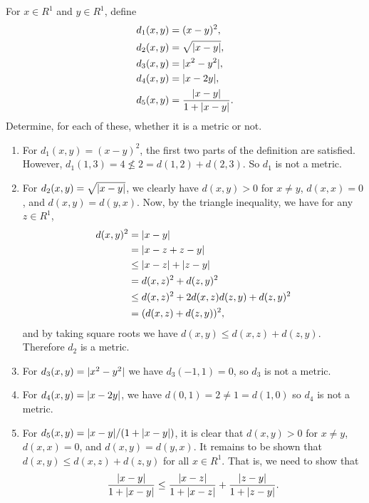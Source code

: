  For $x\in R^1$ and $y\in R^1$, define
\begin{align*}
  d_1(x,y) &= (x - y)^2, \\
  d_2(x,y) &= \sqrt{\lvert{x - y}\rvert}, \\
  d_3(x,y) &= \lvert{x^2 - y^2}\rvert, \\
  d_4(x,y) &= \lvert{x - 2y}\rvert, \\
  d_5(x,y) &= \frac{\lvert{x - y}\rvert}{1 + \lvert{x - y}\rvert}.
\end{align*}
Determine, for each of these, whether it is a metric or not.
\begin{solution}
  \begin{enumerate}
  \item For $d_1(x,y) = (x - y)^2$, the first two parts of the
    definition are satisfied. However,
    $d_1(1,3) = 4 \not\leq 2 = d(1,2) + d(2,3)$. So $d_1$ is not a
    metric.
  \item For $d_2(x,y) = \sqrt{\lvert{x-y}\rvert}$, we clearly have
    $d(x,y) > 0$ for $x\neq y$, $d(x,x) = 0$, and $d(x,y) =
    d(y,x)$. Now, by the triangle inequality, we have for any
    $z\in R^1$,
    \begin{align*}
      d(x,y)^2 &= \lvert{x - y}\rvert \\
               &= \lvert{x - z + z - y}\rvert \\
               &\leq \lvert{x - z}\rvert + \lvert{z - y}\rvert \\
               &= d(x,z)^2 + d(z,y)^2 \\
               &\leq d(x,z)^2 + 2d(x,z)d(z,y) + d(z,y)^2 \\
               &= (d(x,z) + d(z,y))^2,
    \end{align*}
    and by taking square roots we have $d(x,y) \leq d(x,z) +
    d(z,y)$. Therefore $d_2$ is a metric.
  \item For $d_3(x,y) = \lvert{x^2 - y^2}\rvert$ we have $d_3(-1,1) = 0$, so
    $d_3$ is not a metric.
  \item For $d_4(x,y) = \lvert{x - 2y}\rvert$, we have
    $d(0,1) = 2\neq1 = d(1,0)$ so $d_4$ is not a metric.
  \item For $d_5(x,y) = \lvert{x-y}\rvert / (1 + \lvert{x - y}\rvert)$, it is clear
    that $d(x,y) > 0$ for $x\neq y$, $d(x,x) = 0$, and
    $d(x,y) = d(y,x)$. It remains to be shown that
    $d(x,y) \leq d(x,z) + d(z,y)$ for all $x\in R^1$. That is, we need
    to show that
    \begin{equation}
      \label{eq:quotient-metric-triangle-ineq}
      \frac{\abs{x - y}}{1 + \abs{x - y}}
      \leq \frac{\abs{x - z}}{1 + \abs{x - z}}
      + \frac{\abs{z - y}}{1 + \abs{z - y}}.

\end{equation}
\end{enumerate}
\end{solution}
